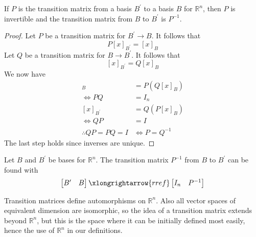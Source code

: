 \begin{theorem}
    If \(P\) is the transition matrix from a basis \(B^{\prime} \) to a basis \(B\) for \(\mathbb{R} ^n\), then \(P\) is invertible and the transition matrix from \(B\) to \(B^{\prime} \) is \(P ^{-1} \).
\end{theorem}
\begin{proof}
    Let \(P\) be a transition matrix for \(B^{\prime} \to B\). It follows that
    \[
        P[x]_{B^{\prime} }=[x]_B
    \]
    Let \(Q\) be a transition matrix for \(B\to B^{\prime} \). It follows that
    \[
        [x]_{B^{\prime} }=Q[x]_B
    \]
    We now have
    \begin{align*}
        [x]_B &=P\left( Q[x]_B \right)\\
        \iff PQ&=I_n\\
        [x]_{B^{\prime}} &=Q\left( P[x]_B \right)\\
        \iff QP&=I\\
        \therefore QP=PQ=I&\iff P=Q^{-1} 
    \end{align*}
    The last step holds since inverses are unique.
\end{proof}
\begin{theorem}
    Let \(B\) and \(B^{\prime} \) be bases for \(\mathbb{R}^n\). The transition matrix \(P ^{-1} \) from \(B\) to \(B^{\prime} \) can be found with
    \[
        \begin{bmatrix}
            B^{\prime}  &B   \\
        \end{bmatrix}\xlongrightarrow{rref} \begin{bmatrix}
            I_n &P ^{-1}    \\
        \end{bmatrix}
    \]
\end{theorem}
\begin{remark}
    Transition matrices define automorphisms on \(\mathbb{R}^n\). Also all vector spaces of equivalent dimension are isomorphic, so the idea of a transition matrix extends beyond \(\mathbb{R} ^n\), but this is the space where it can be initially defined most easily, hence the use of \(\mathbb{R}^n\) in our definitions.
\end{remark}

